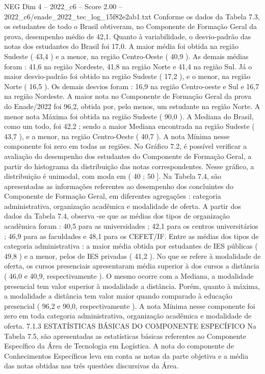\begin{textsample}{NEG Dim 4 – 2022\_c6 – Score 2.00 – 2022\_c6/enade\_2022\_tec\_log\_15f82e2ab1.txt}
Conforme os dados da Tabela 7.3, os estudantes de todo o Brasil obtiveram, no Componente de Formação Geral da prova, desempenho médio de 42,1.
Quanto à variabilidade, o desvio-padrão das notas dos estudantes do Brasil foi 17,0.
A maior média foi obtida na região Sudeste ( 43,4 ) e a menor, na região Centro-Oeste ( 40,9 ).
As demais médias foram : 41,6 na região Nordeste, 41,8 na região Norte e 41,4 na região Sul.
Já o maior desvio-padrão foi obtido na região Sudeste ( 17,2 ), e o menor, na região Norte ( 16,5 ).
Os demais desvios foram : 16,9 na região Centro-oeste e Sul e 16,7 na região Nordeste.
A maior nota no Componente de Formação Geral da prova do Enade/2022 foi 96,2, obtida por, pelo menos, um estudante na região Norte.
A menor nota Máxima foi obtida na região Sudeste ( 90,0 ).
A Mediana do Brasil, como um todo, foi 42,2 ; sendo a maior Mediana encontrada na região Sudeste ( 43,7 ), e a menor, na região Centro-Oeste ( 40,7 ).
A nota Mínima nesse componente foi zero em todas as regiões.
No Gráfico 7.2, é possível verificar a avaliação do desempenho dos estudantes do Componente de Formação Geral, a partir do histograma da distribuição das notas correspondentes.
Nesse gráfico, a distribuição é unimodal, com moda em ( 40 ; 50 ].
Na Tabela 7.4, são apresentadas as informações referentes ao desempenho dos concluintes do Componente de Formação Geral, em diferentes agregações : categoria administrativa, organização acadêmica e modalidade de oferta.
A partir dos dados da Tabela 7.4, observa -se que as médias dos tipos de organização acadêmica foram : 40,5 para as universidades ; 42,1 para os centros universitários ; 46,9 para as faculdades e 48,1 para os CEFET/IF.
Entre as médias dos tipos de categoria administrativa : a maior média obtida por estudantes de IES públicas ( 49,8 ) e a menor, pelos de IES privadas ( 41,2 ).
No que se refere à modalidade de oferta, os cursos presenciais apresentaram média superior à dos cursos a distância ( 46,0 e 40,9, respectivamente ).
O mesmo ocorre com a Mediana, a modalidade presencial tem valor superior à modalidade a distância.
Porém, quanto à máxima, a modalidade a distância tem valor maior quando comparado à educação presencial ( 96,2 e 90,0, respectivamente ).
A nota Mínima nesse componente foi zero em toda categoria administrativa, organização acadêmica e modalidade de oferta. 7.1.3 ESTATÍSTICAS BÁSICAS DO COMPONENTE ESPECÍFICO Na Tabela 7.5, são apresentadas as estatísticas básicas referentes ao Componente Específico da Área de Tecnologia em Logística.
A nota do componente de Conhecimentos Específicos leva em conta as notas da parte objetiva e a média das notas obtidas nas três questões discursivas da Área.

\end{textsample}
